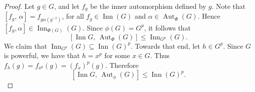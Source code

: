\documentclass[10pt,a4paper]{amsart}
\begin{document}
\begin{proof}
Let $g \in G$, and let $f_g$ be the inner automorphism defined by $g$. Note that $[f_g,\, \alpha]= f_{g\alpha(g^{-1})}$, for all $f_g \in \operatorname{Inn}(G)$ and $\alpha \in \operatorname{Aut}_\Phi(G)$.
Hence ${[f_g, \alpha] \in \operatorname{Inn}_{\Phi(G)}(G)}$. 
Since $\phi(G) = G^p$, it follows that
\[
[\operatorname{Inn} G,\, \operatorname{Aut}_\Phi(G)] \leqslant \operatorname{Inn}_{G^p}(G).
\]
We claim that $\operatorname{Inn}_{G^p}(G) 
\subseteq \operatorname{Inn}(G)^p$. Towards that end, let $h \in G^p$. Since $G$ is powerful, we have that $h=x^p$ for some $x\in G$. Thus ${f_h(g)=f_{x^p}(g)=(f_{x})^p(g)}$. Therefore
\[
[\operatorname{Inn} G,\, \operatorname{Aut}_\phi(G)] \leqslant \operatorname{Inn}(G)^p.
\]
\end{proof} 
\end{document}
